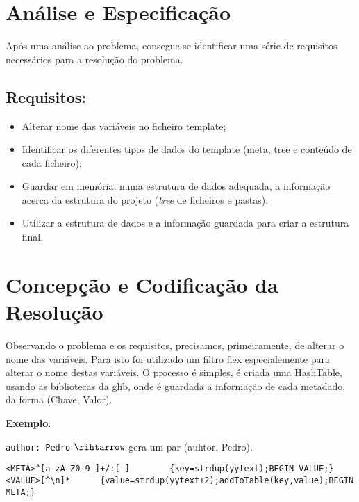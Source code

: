 \documentclass[12pt]{article}
\begin{document}
\newpage

\section{Análise e Especificação}

\vspace{1cm}

Após uma análise ao problema, consegue-se identificar uma série de requisitos necessários para a resolução do problema.

\subsection{Requisitos:}

\vspace{0.5cm}

\begin{itemize}
    \item Alterar nome das variáveis no ficheiro template;
    \item Identificar os diferentes tipos de dados do template (meta, tree e conteúdo de cada ficheiro);
    \item Guardar em memória, numa estrutura de dados adequada, a informação acerca da estrutura do projeto (\textit{tree} de ficheiros e pastas).
    \item Utilizar a estrutura de dados e a informação guardada para criar a estrutura final.
\end{itemize}

\vspace{1cm}

\section{Concepção e Codificação da Resolução}

Observando o problema e os requisitos, precisamos, primeiramente, de alterar o nome das variáveis. Para isto foi utilizado um filtro flex especialemente para alterar o nome destas variáveis. O processo é simples, é criada uma HashTable, usando as bibliotecas da glib, onde é guardada a informação de cada metadado, da forma (Chave, Valor).

\textbf{Exemplo}:

\indent\indent\texttt{author: Pedro}  $\rihtarrow$ gera um par (auhtor, Pedro).

\vspace{0.5cm}
\begin{tcolorbox}
\begin{verbatim}
<META>^[a-zA-Z0-9_]+/:[ ]        {key=strdup(yytext);BEGIN VALUE;}
<VALUE>[^\n]*      {value=strdup(yytext+2);addToTable(key,value);BEGIN META;}
\end{verbatim}
\end{tcolorbox}
\end{document}
